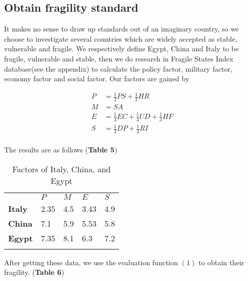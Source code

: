 \documentclass{mcmthesis}
\newlength\savedwidth
\newcommand\whline{\noalign{\global\savedwidth\arrayrulewidth
		\global\arrayrulewidth 1.2pt}%
	\hline
	\noalign{\global\arrayrulewidth\savedwidth}}
\newlength\savewidth
\newcommand\shline{\noalign{\global\savewidth\arrayrulewidth
		\global\arrayrulewidth 1.2pt}%
	\hline
	\noalign{\global\arrayrulewidth\savewidth}}
\begin{document}
	\subsection{Obtain fragility standard}
	It makes no sense to draw up standards out of an imaginary country, so we choose to investigate several countries which are widely accepted as stable, vulnerable and fragile.
	We respectively define Egypt, China and Italy to be fragile, vulnerable and stable, then we do research in Fragile States Index database(see the appendix) to calculate the policy factor, military factor, economy factor and social factor. Our factors are gained by 
	\begin{spacing}{1.5}
		\begin{equation}
		\begin{aligned}
		P&=\frac{1}{2}PS+\frac{1}{2}HR\\
		M&=SA\\
		E&=\frac{1}{3}EC+\frac{1}{3}UD+\frac{1}{3}HF\\
		S&=\frac{1}{2}DP+\frac{1}{2}RI\\
		\end{aligned}
		\end{equation}
	\end{spacing}
	
	The results are as follows (\textbf{Table 5})
	
	\begin{table}[htbp]
		\renewcommand\arraystretch{1.5}
		\footnotesize
		\centering
		\begin{tabular}{m{2cm}<{\centering}|m{2cm}<{\centering}|m{2cm}<{\centering}|m{2cm}<{\centering}|m{2cm}<{\centering}}
			\whline
			&\textbf{$P$}&\textbf{$M$}&\textbf{$E$}&\textbf{$S$}\\
			\whline
			\textbf{Italy}& 2.35 & 4.5 & 3.43 & 4.9\\
			
			\textbf{China}& 7.1 & 5.9 & 5.53 & 5.8\\
			
			\textbf{Egypt}& 7.35 & 8.1 & 6.3 & 7.2\\
			
			\shline
		\end{tabular}
		\caption{Factors of Italy, China, and Egypt}\label{tab:Factors of Italy, China, and Egypt}
	\end{table}
	After getting these data, we use the evaluation function $(1)$ to obtain their fragility. (\textbf{Table 6})
	
\end{document}
